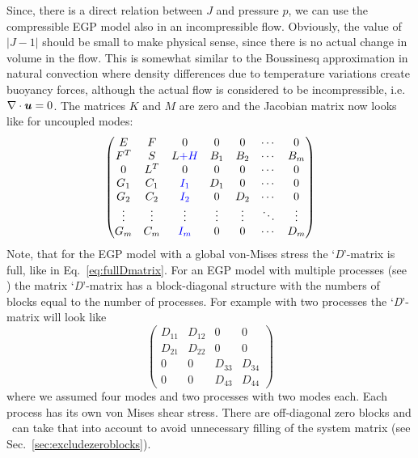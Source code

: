 Since, there is a direct relation between $J$ and pressure $p$, we can use the compressible EGP model also in an incompressible flow. Obviously, the value of $|J-1|$ should be small to make physical sense, since there is no actual change in volume in the flow. This is somewhat similar to the Boussinesq approximation in natural convection where density differences due to temperature variations create buoyancy forces, although the actual flow is considered to be incompressible, i.e.\ $\nabla\cdot\boldsymbol{u}=0$. The matrices  $K$ and $M$ are zero and the Jacobian matrix now looks like for uncoupled modes:
\[
   \begin{pmatrix}
     E & F & 0 & 0 & 0 & \cdots & 0 \\
     F^T & S & L\textcolor{blue}{+H} & B_1 & B_2 & \cdots & B_m \\
     0 & L^T & 0 & 0 & 0 & \cdots & 0 \\
     G_1 & C_1 & \textcolor{blue}{I_1} & D_1 & 0 & \cdots & 0 \\
     G_2 & C_2 & \textcolor{blue}{I_2} & 0 & D_2 & \cdots & 0 \\
      \vdots &\vdots  & \vdots & \vdots & \vdots & \ddots & \vdots \\
     G_m & C_m& \textcolor{blue}{I_m} & 0 & 0& \cdots & D_m \\
    \end{pmatrix}
\]
Note, that for the EGP model with a global von-Mises stress the `\textit{D}'-matrix is full, like in Eq.~\eqref{eq:fullDmatrix}. For an EGP model with multiple processes (see \cite{van_breemen_rate_2012}) the matrix 
`\textit{D}'-matrix has a block-diagonal structure with the numbers of blocks equal to the number of processes. For example with two processes the `\textit{D}'-matrix will look like
\[
    \begin{pmatrix}
     D_{11} & D_{12} & 0 & 0 \\
     D_{21} & D_{22} & 0 & 0 \\
     0      & 0      & D_{33} & D_{34} \\
     0      & 0      & D_{43} & D_{44} 
    \end{pmatrix}\label{eq:blockDmatrix}
\]
where we assumed four modes and two processes with two modes each. Each process has its own von Mises shear stress. There are off-diagonal zero blocks and \tfem\ can take that into account to avoid unnecessary filling of the system matrix (see Sec.~\ref{sec:excludezeroblocks}).

